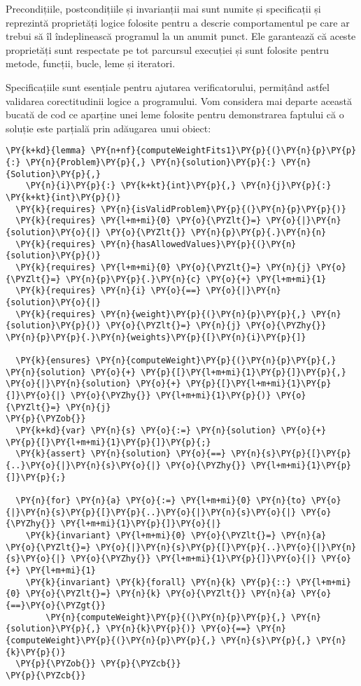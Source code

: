 Precondițiile, postcondițiile și invarianții mai sunt numite și specificații și reprezintă proprietăți logice folosite pentru a descrie comportamentul pe care ar trebui să îl îndeplinească programul la un anumit punct. Ele garantează că aceste proprietăți sunt respectate pe tot parcursul execuției și sunt folosite pentru metode, funcții, bucle, leme și iteratori. \par
Specificațiile sunt esențiale pentru ajutarea verificatorului, permițând astfel validarea corectitudinii logice a programului. Vom considera mai departe această bucată de cod ce aparține unei leme folosite pentru demonstrarea faptului că o soluție este parțială prin adăugarea unui obiect:
\begin{Verbatim}[commandchars=\\\{\}]
\PY{k+kd}{lemma} \PY{n+nf}{computeWeightFits1}\PY{p}{(}\PY{n}{p}\PY{p}{:} \PY{n}{Problem}\PY{p}{,} \PY{n}{solution}\PY{p}{:} \PY{n}{Solution}\PY{p}{,} 
    \PY{n}{i}\PY{p}{:} \PY{k+kt}{int}\PY{p}{,} \PY{n}{j}\PY{p}{:} \PY{k+kt}{int}\PY{p}{)}
  \PY{k}{requires} \PY{n}{isValidProblem}\PY{p}{(}\PY{n}{p}\PY{p}{)}
  \PY{k}{requires} \PY{l+m+mi}{0} \PY{o}{\PYZlt{}=} \PY{o}{|}\PY{n}{solution}\PY{o}{|} \PY{o}{\PYZlt{}} \PY{n}{p}\PY{p}{.}\PY{n}{n}
  \PY{k}{requires} \PY{n}{hasAllowedValues}\PY{p}{(}\PY{n}{solution}\PY{p}{)}
  \PY{k}{requires} \PY{l+m+mi}{0} \PY{o}{\PYZlt{}=} \PY{n}{j} \PY{o}{\PYZlt{}=} \PY{n}{p}\PY{p}{.}\PY{n}{c} \PY{o}{+} \PY{l+m+mi}{1}
  \PY{k}{requires} \PY{n}{i} \PY{o}{==} \PY{o}{|}\PY{n}{solution}\PY{o}{|}
  \PY{k}{requires} \PY{n}{weight}\PY{p}{(}\PY{n}{p}\PY{p}{,} \PY{n}{solution}\PY{p}{)} \PY{o}{\PYZlt{}=} \PY{n}{j} \PY{o}{\PYZhy{}} \PY{n}{p}\PY{p}{.}\PY{n}{weights}\PY{p}{[}\PY{n}{i}\PY{p}{]}
  
  \PY{k}{ensures} \PY{n}{computeWeight}\PY{p}{(}\PY{n}{p}\PY{p}{,} \PY{n}{solution} \PY{o}{+} \PY{p}{[}\PY{l+m+mi}{1}\PY{p}{]}\PY{p}{,} \PY{o}{|}\PY{n}{solution} \PY{o}{+} \PY{p}{[}\PY{l+m+mi}{1}\PY{p}{]}\PY{o}{|} \PY{o}{\PYZhy{}} \PY{l+m+mi}{1}\PY{p}{)} \PY{o}{\PYZlt{}=} \PY{n}{j}
\PY{p}{\PYZob{}}
  \PY{k+kd}{var} \PY{n}{s} \PY{o}{:=} \PY{n}{solution} \PY{o}{+} \PY{p}{[}\PY{l+m+mi}{1}\PY{p}{]}\PY{p}{;}
  \PY{k}{assert} \PY{n}{solution} \PY{o}{==} \PY{n}{s}\PY{p}{[}\PY{p}{..}\PY{o}{|}\PY{n}{s}\PY{o}{|} \PY{o}{\PYZhy{}} \PY{l+m+mi}{1}\PY{p}{]}\PY{p}{;}

  \PY{n}{for} \PY{n}{a} \PY{o}{:=} \PY{l+m+mi}{0} \PY{n}{to} \PY{o}{|}\PY{n}{s}\PY{p}{[}\PY{p}{..}\PY{o}{|}\PY{n}{s}\PY{o}{|} \PY{o}{\PYZhy{}} \PY{l+m+mi}{1}\PY{p}{]}\PY{o}{|}
    \PY{k}{invariant} \PY{l+m+mi}{0} \PY{o}{\PYZlt{}=} \PY{n}{a} \PY{o}{\PYZlt{}=} \PY{o}{|}\PY{n}{s}\PY{p}{[}\PY{p}{..}\PY{o}{|}\PY{n}{s}\PY{o}{|} \PY{o}{\PYZhy{}} \PY{l+m+mi}{1}\PY{p}{]}\PY{o}{|} \PY{o}{+} \PY{l+m+mi}{1}
    \PY{k}{invariant} \PY{k}{forall} \PY{n}{k} \PY{p}{::} \PY{l+m+mi}{0} \PY{o}{\PYZlt{}=} \PY{n}{k} \PY{o}{\PYZlt{}} \PY{n}{a} \PY{o}{==}\PY{o}{\PYZgt{}} 
        \PY{n}{computeWeight}\PY{p}{(}\PY{n}{p}\PY{p}{,} \PY{n}{solution}\PY{p}{,} \PY{n}{k}\PY{p}{)} \PY{o}{==} \PY{n}{computeWeight}\PY{p}{(}\PY{n}{p}\PY{p}{,} \PY{n}{s}\PY{p}{,} \PY{n}{k}\PY{p}{)}
  \PY{p}{\PYZob{}} \PY{p}{\PYZcb{}}
\PY{p}{\PYZcb{}}
\end{Verbatim}

